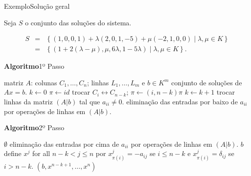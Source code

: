 \documentclass{beamer}
\begin{document}
\begin{frame}{Exemplo}{Solução geral}

Seja $S$ o conjunto das soluções do sistema.

\begin{eqnarray*}
S&=& \left \{(1,0,0,1) + \lambda (2,0,1,-5) + \mu (-2,1,0,0) \mid \lambda,\mu \in K\right\}\\
&=& \left \{  (1+2(\lambda-\mu), \mu, 6\lambda, 1-5\lambda) \mid \lambda,\mu \in K\right\}.
\end{eqnarray*}



\end{frame}

\begin{frame}[fragile]{\bf Algoritmo}{1º Passo}
\begin{algorithmic}
\REQUIRE matriz $A$: colunas $C_1, \ldots, C_n$; linhas $L_1, \ldots, L_m$ e $b \in K^m$
\ENSURE conjunto de soluções de $Ax=b$.
  \STATE $k \leftarrow 0$
  \STATE $\pi\leftarrow id$
				\STATE trocar $C_i \leftrightarrow C_{n-k}$; $\pi \leftarrow (i, n-k)\pi $
				\STATE $k\leftarrow k+1$
			 \ELSE
			 	\STATE trocar linhas da matriz $(A|b)$ tal que $a_{ii}\neq 0$.
				\STATE eliminação das entradas por baixo de $a_{ii}$ por operações de linhas em $(A|b)$.
			\ENDIF
   \ENDFOR
\end{algorithmic}
\end{frame}

\begin{frame}[fragile]{\bf Algoritmo}{2º Passo}
\begin{algorithmic}
  	\RETURN $\emptyset$
  \ELSE
				\STATE eliminação das entradas por cima de $a_{ii}$ por operações de linhas em $(A|b)$.
   \ENDFOR
  	\RETURN $b$
    \ELSE 
    	  \STATE define $x^j$ for all $n-k<j\leq n$ por $x^j_{\pi(i)}=-a_{ij}$ se $i\leq n-k$ e $x^j_{\pi(i)} = \delta_{ij}$ se $i>n-k$.
	  \RETURN $(b, x^{n-k+1}, \ldots, x^n)$
    \ENDIF
  \ENDIF
\end{algorithmic}
\end{frame}
\end{document}
